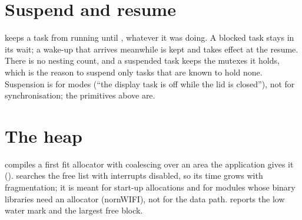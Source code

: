 \section{Suspend and resume}

 keeps a task from running until , whatever it was
doing. A blocked task stays in its wait; a wake-up that arrives meanwhile is kept and
takes effect at the resume. There is no nesting count, and a suspended task keeps the
mutexes it holds, which is the reason to suspend only tasks that are known to hold none.
Suspension is for modes (``the display task is off while the lid is closed''), not for
synchronisation; the primitives above are.

\section{The heap}

 compiles a first fit allocator with coalescing over an area the
application gives it ().  searches the free list
with interrupts disabled, so its time grows with fragmentation; it is meant for
start-up allocations and for modules whose binary libraries need an allocator
(nornWIFI), not for the data path.  reports the low water mark and
the largest free block.

